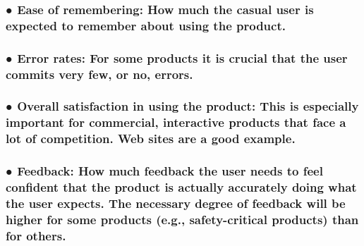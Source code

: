 \documentclass[
]{article}
\begin{document}
\hypertarget{ease-of-remembering-how-much-the-casual-user-is-expected-to-remember-about-using-the-product.}{%
\subsubsection{● Ease of remembering: How much the casual user is
expected to remember about using the
product.}\label{ease-of-remembering-how-much-the-casual-user-is-expected-to-remember-about-using-the-product.}}

\hypertarget{error-rates-for-some-products-it-is-crucial-that-the-user-commits-very-few-or-no-errors.}{%
\subsubsection{\texorpdfstring{● Error rates: For some products it is
crucial that the user commits very few, or no, errors.
}{● Error rates: For some products it is crucial that the user commits very few, or no, errors. }}\label{error-rates-for-some-products-it-is-crucial-that-the-user-commits-very-few-or-no-errors.}}

\hypertarget{overall-satisfaction-in-using-the-product-this-is-especially-important-for-commercial-interactive-products-that-face-a-lot-of-competition.-web-sites-are-a-good-example.}{%
\subsubsection{\texorpdfstring{● Overall satisfaction in using the
product: This is especially important for commercial, interactive
products that face a lot of competition. Web sites are a good example.
}{● Overall satisfaction in using the product: This is especially important for commercial, interactive products that face a lot of competition. Web sites are a good example. }}\label{overall-satisfaction-in-using-the-product-this-is-especially-important-for-commercial-interactive-products-that-face-a-lot-of-competition.-web-sites-are-a-good-example.}}

\hypertarget{feedback-how-much-feedback-the-user-needs-to-feel-confident-that-the-product-is-actually-accurately-doing-what-the-user-expects.-the-necessary-degree-of-feedback-will-be-higher-for-some-products-e.g.-safety-critical-products-than-for-others.}{%
\subsubsection{● Feedback: How much feedback the user needs to feel
confident that the product is actually accurately doing what the user
expects. The necessary degree of feedback will be higher for some
products (e.g., safety-critical products) than for
others.}\label{feedback-how-much-feedback-the-user-needs-to-feel-confident-that-the-product-is-actually-accurately-doing-what-the-user-expects.-the-necessary-degree-of-feedback-will-be-higher-for-some-products-e.g.-safety-critical-products-than-for-others.}}
\end{document}

